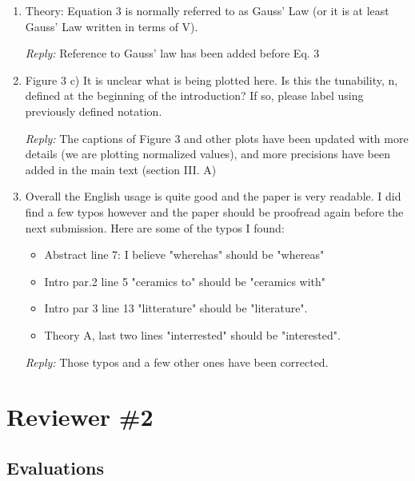 \documentclass[%
 aip,
 amsmath,amssymb,
 reprint,%
]{revtex4-1}
\newcommand{\rep}[1]{\textcolor{reply}{\textit{Reply:} #1}}
\begin{document}
\begin{enumerate}
\item Theory: Equation 3 is normally referred to as Gauss' Law (or it is at least Gauss' Law written in
 terms of V).

 \rep{Reference to Gauss' law has been added before Eq. 3}

\item Figure 3 c) It is unclear what is being plotted here. Is this the tunability, n, defined at the
 beginning of the introduction? If so, please label using previously defined notation.


 \rep{The captions of Figure 3 and other plots have been updated with more details (we are plotting normalized values),
 and more precisions have been added in the main text (section III. A)}




\item Overall the English usage is quite good and the paper is very readable. I did find a few typos
 however and the paper should be proofread again before the next submission. Here are some of the typos I
  found:
\begin{itemize}
  \item Abstract line 7: I believe "wherehas" should be "whereas"

  \item Intro par.2 line 5 "ceramics to" should be "ceramics with"

  \item Intro par 3 line 13 "litterature" should be "literature".

  \item Theory A, last two lines "interrested" should be "interested".
\end{itemize}
\rep{Those typos and a few other ones have been corrected.}

\end{enumerate}

\section{Reviewer \#2}
\subsection{Evaluations}
\end{document}
